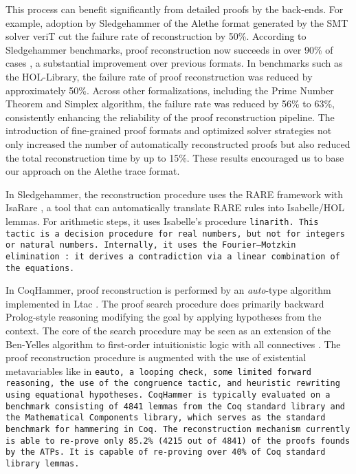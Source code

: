 This process can benefit significantly from detailed proofs by the back-ends.
For example, adoption by Sledgehammer of the Alethe format generated by the SMT solver veriT \cite{isabelle1,isabelle2} cut the failure rate of reconstruction by 50\%.
According to Sledgehammer benchmarks, proof reconstruction now succeeds in over 90\% of cases \cite{verit-recon, SledgehammerReconImprove}, a substantial improvement over previous formats.
In benchmarks such as the HOL-Library, the failure rate of proof reconstruction was reduced by approximately 50\%.
Across other formalizations, including the Prime Number Theorem and Simplex algorithm, the failure rate was reduced by 56\% to 63\%, consistently enhancing the reliability of the proof reconstruction pipeline.
The introduction of fine-grained proof formats and optimized solver strategies not only increased the number of automatically reconstructed proofs but also reduced the total reconstruction time by up to 15\%.
These results encouraged us to base our approach on the Alethe trace format.

In Sledgehammer, the reconstruction procedure uses the RARE framework with IsaRare \cite{IsaRare}, a tool that can automatically translate RARE rules into Isabelle/HOL lemmas.
For arithmetic steps, it uses Isabelle's procedure \tt{linarith}. This tactic is a decision procedure for real numbers, but not for integers or natural numbers.
Internally, it uses the Fourier–Motzkin elimination \cite{linear-arith-book}: it derives a contradiction via a linear combination of the equations.

In CoqHammer, proof reconstruction is performed by an \emph{auto}-type algorithm implemented in Ltac \cite{ltac}.
The proof search procedure does primarily backward Prolog-style reasoning modifying the goal by applying hypotheses from the context.
The core of the search procedure may be seen as an extension of the Ben-Yelles algorithm to first-order intuitionistic logic with all connectives \cite{urzyczyn_intuitionistic_2016}.
The proof reconstruction procedure is augmented with  the use of existential metavariables like in \tt{eauto}, a looping check, some limited forward reasoning, the use of the \tt{congruence tactic}, and heuristic
rewriting using equational hypotheses.
CoqHammer is typically evaluated on a benchmark consisting of 4841 lemmas from the Coq standard library and the Mathematical Components library, which serves as the standard benchmark for hammering in Coq.
The reconstruction mechanism currently is able to re-prove only 85.2\% (4215 out of 4841) of the proofs founds by the ATPs.
It is capable of re-proving over 40\% of Coq standard library lemmas.


